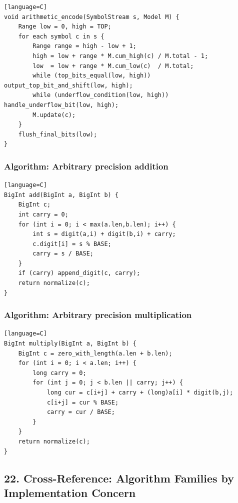 \documentclass[11pt]{article}
\begin{document}
\begin{verbatim}[language=C]
void arithmetic_encode(SymbolStream s, Model M) {
    Range low = 0, high = TOP;
    for each symbol c in s {
        Range range = high - low + 1;
        high = low + range * M.cum_high(c) / M.total - 1;
        low  = low + range * M.cum_low(c)  / M.total;
        while (top_bits_equal(low, high)) output_top_bit_and_shift(low, high);
        while (underflow_condition(low, high)) handle_underflow_bit(low, high);
        M.update(c);
    }
    flush_final_bits(low);
}
\end{verbatim}

\subsubsection{Algorithm: Arbitrary precision addition}\label{algorithm-arbitrary-precision-addition}

\begin{verbatim}[language=C]
BigInt add(BigInt a, BigInt b) {
    BigInt c;
    int carry = 0;
    for (int i = 0; i < max(a.len,b.len); i++) {
        int s = digit(a,i) + digit(b,i) + carry;
        c.digit[i] = s % BASE;
        carry = s / BASE;
    }
    if (carry) append_digit(c, carry);
    return normalize(c);
}
\end{verbatim}

\subsubsection{Algorithm: Arbitrary precision multiplication}\label{algorithm-arbitrary-precision-multiplication}

\begin{verbatim}[language=C]
BigInt multiply(BigInt a, BigInt b) {
    BigInt c = zero_with_length(a.len + b.len);
    for (int i = 0; i < a.len; i++) {
        long carry = 0;
        for (int j = 0; j < b.len || carry; j++) {
            long cur = c[i+j] + carry + (long)a[i] * digit(b,j);
            c[i+j] = cur % BASE;
            carry = cur / BASE;
        }
    }
    return normalize(c);
}
\end{verbatim}

\subsection{22. Cross-Reference: Algorithm Families by Implementation Concern}\label{cross-reference-algorithm-families-by-implementation-concern}
\end{document}
